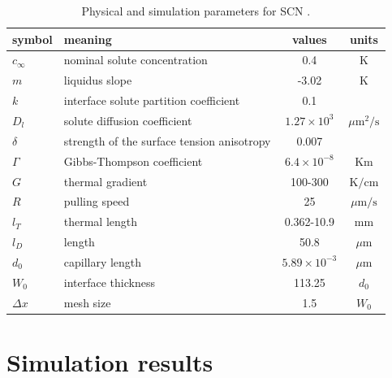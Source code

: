 \documentclass[a4paper,12pt]{article}
\begin{document}
\begin{table}
\centering
\caption{Physical and simulation parameters for SCN \cite{Tourret2015}.}
\begin{tabular}{l l c c }
\toprule
symbol & meaning & values & units \\
\midrule
$c_{\infty}$ & nominal solute concentration &  0.4 & K \\
$m$ &liquidus slope &  -3.02 & K \\
$k$ & interface solute partition coefficient & 0.1 &\\
$D_l$ & solute diffusion coefficient &  $1.27\times 10^{3}$  & ${\mu\text{m}}^2/\text{s}$ \\
$\delta$ & strength of the surface tension anisotropy  &  0.007  &\\
$\Gamma$ & Gibbs-Thompson coefficient & $6.4\times 10^{-8}$ & Km \\
$G$ & thermal gradient & 100-300 & $\text{K} / \text{cm}$ \\
$R$ & pulling speed &  25 & $\mu \text{m} / \text{s}$ \\
$l_T$ & thermal length &  0.362-10.9  & mm \\
$l_D$ & length &  50.8  & $\mu$m \\
$d_0$ & capillary length & $ 5.89\times10^{-3}$  & $\mu$m \\
$W_0$ & interface thickness  & 113.25 & $d_0$ \\
$\Delta x$ & mesh size & 1.5 & $W_0$ \\
\bottomrule
\end{tabular}\label{tab:Tourret}

\end{table}



\section{Simulation results}
\end{document}

